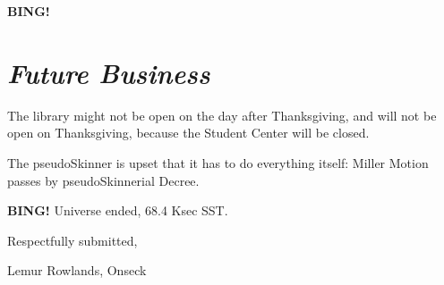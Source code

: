 \documentclass[10pt]{article}
\newcommand{\bing}{{\bf BING!} }
\newcommand{\goto}[1]{\bing \vskip 12pt \section*{{\em{#1}}}}
\newcommand{\onseck}{Lemur Rowlands, Onseck}
\begin{document}
\goto{Future Business}



The library might not be open on the day after Thanksgiving, and will not be
open on Thanksgiving, because the Student Center will be closed.

The pseudoSkinner is upset that it has to do everything itself: Miller Motion 
passes by pseudoSkinnerial Decree.

\bing
\noindent
Universe ended, 68.4 Ksec SST.

\vspace{18pt}

\centerline{Respectfully submitted,}
\centerline{\onseck}
\end{document}
